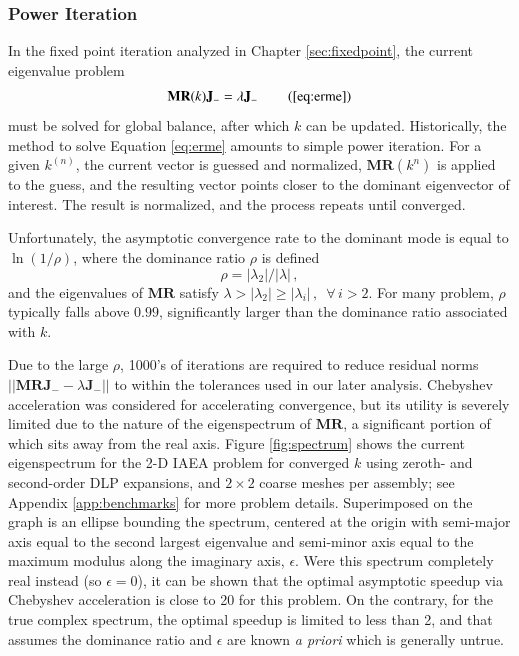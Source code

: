 \subsubsection{Power Iteration}

In the fixed point iteration analyzed in Chapter \ref{sec:fixedpoint}, 
the current eigenvalue problem 
\begin{equation}
   \oper{M}\mathbf{R}(k)\mathbf{J_-}  = \lambda \mathbf{J_-} \, 
   \tag{\ref{eq:erme}}
\end{equation}
must be solved for global balance, after which $k$ can be updated.
Historically, the method to solve Equation \ref{eq:erme} amounts to 
simple power iteration.
For a given $k^{(n)}$, the current vector is guessed and normalized, 
$\mathbf{MR}(k^{n})$ is applied to the guess, and the resulting vector 
points closer to the dominant eigenvector of interest.  The result 
is normalized, and the process repeats until converged. 

Unfortunately, the asymptotic convergence rate to the dominant mode is 
equal to $\ln{(1/\rho)}$, where the dominance ratio $\rho$  is defined
\begin{equation}
 \rho = |\lambda_2| / |\lambda| \, ,
\end{equation}
and the eigenvalues of 
$\mathbf{M}\mathbf{R}$ satisfy 
$\lambda > |\lambda_2| \geq |\lambda_i| \, , \,\,\, \forall \, i > 2$.  
For many problem, $\rho$ typically falls 
above $0.99$, significantly larger than the dominance ratio associated 
with $k$.

Due to the large $\rho$, 1000's of iterations are required to reduce 
residual norms $||\mathbf{MRJ}_- - \lambda \mathbf{J}_-||$ to within the
tolerances used in our later analysis.  Chebyshev acceleration 
was considered for accelerating convergence, but its utility is severely 
limited due to the nature of the eigenspectrum of $\mathbf{MR}$, a 
significant portion of which sits away from the real axis.  
Figure \ref{fig:spectrum} shows the current eigenspectrum for
the 2-D IAEA problem \cite{anl1977benchmark} for converged $k$ using 
zeroth- and second-order DLP expansions, and $2\times 2$ coarse 
meshes per assembly; see Appendix \ref{app:benchmarks} for 
more problem details.  Superimposed on the graph is an ellipse 
bounding the spectrum, centered at the origin with 
semi-major axis equal to the second largest eigenvalue and semi-minor axis 
equal to the maximum modulus along the imaginary axis, $\epsilon$.  Were 
this spectrum completely real instead (so $\epsilon = 0$), it can be 
shown \cite{hageman1967cpm} that the optimal asymptotic speedup via 
Chebyshev acceleration is close to 20 for this problem.  On the contrary, 
for the true complex spectrum, the optimal speedup is limited to less 
than 2, and that assumes the dominance ratio and $\epsilon$ are known
{\it a priori} which is generally untrue. 

